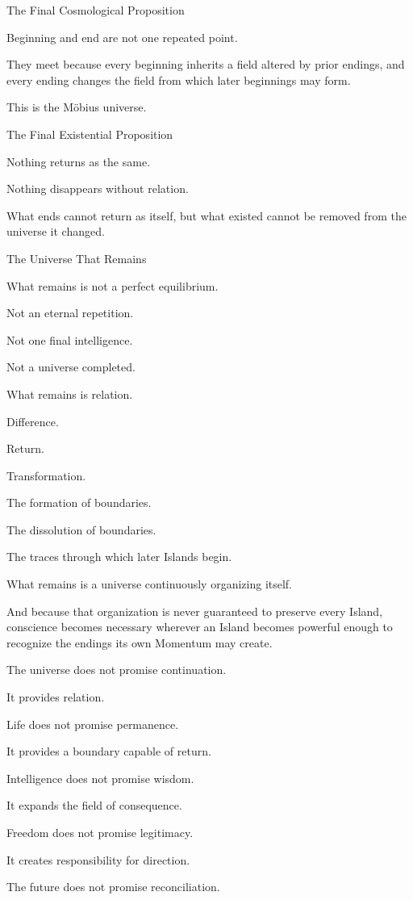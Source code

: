 The Final Cosmological Proposition

Beginning and end are not one repeated point.

They meet because every beginning inherits a field altered by prior endings, and every ending changes the field from which later beginnings may form.

This is the Möbius universe.

The Final Existential Proposition

Nothing returns as the same.

Nothing disappears without relation.

What ends cannot return as itself, but what existed cannot be removed from the universe it changed.

The Universe That Remains

What remains is not a perfect equilibrium.

Not an eternal repetition.

Not one final intelligence.

Not a universe completed.

What remains is relation.

Difference.

Return.

Transformation.

The formation of boundaries.

The dissolution of boundaries.

The traces through which later Islands begin.

What remains is a universe continuously organizing itself.

And because that organization is never guaranteed to preserve every Island, conscience becomes necessary wherever an Island becomes powerful enough to recognize the endings its own Momentum may create.

The universe does not promise continuation.

It provides relation.

Life does not promise permanence.

It provides a boundary capable of return.

Intelligence does not promise wisdom.

It expands the field of consequence.

Freedom does not promise legitimacy.

It creates responsibility for direction.

The future does not promise reconciliation.

